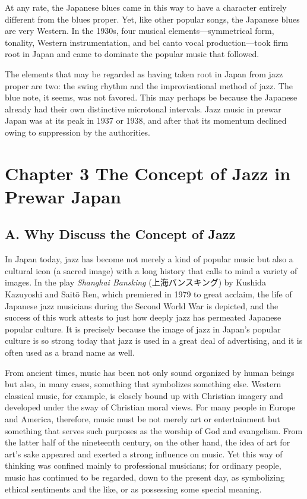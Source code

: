 At any rate, the Japanese blues came in this way to have a character entirely different from the blues proper. Yet, like other popular songs, the Japanese blues are very Western. In the 1930s, four musical elements—symmetrical form, tonality, Western instrumentation, and bel canto vocal production—took firm root in Japan and came to dominate the popular music that followed.

The elements that may be regarded as having taken root in Japan from jazz proper are two: the swing rhythm and the improvisational method of jazz. The blue note, it seems, was not favored. This may perhaps be because the Japanese already had their own distinctive microtonal intervals. Jazz music in prewar Japan was at its peak in 1937 or 1938, and after that its momentum declined owing to suppression by the authorities.

\section{Chapter 3  The Concept of Jazz in Prewar Japan}

\subsection{A. Why Discuss the Concept of Jazz}

In Japan today, jazz has become not merely a kind of popular music but also a cultural icon (a sacred image) with a long history that calls to mind a variety of images. In the play \textit{Shanghai Bansking} (上海バンスキング) by Kushida Kazuyoshi and Saitō Ren, which premiered in 1979 to great acclaim, the life of Japanese jazz musicians during the Second World War is depicted, and the success of this work attests to just how deeply jazz has permeated Japanese popular culture. It is precisely because the image of jazz in Japan's popular culture is so strong today that jazz is used in a great deal of advertising, and it is often used as a brand name as well.

From ancient times, music has been not only sound organized by human beings but also, in many cases, something that symbolizes something else. Western classical music, for example, is closely bound up with Christian imagery and developed under the sway of Christian moral views. For many people in Europe and America, therefore, music must be not merely art or entertainment but something that serves such purposes as the worship of God and evangelism. From the latter half of the nineteenth century, on the other hand, the idea of art for art's sake appeared and exerted a strong influence on music. Yet this way of thinking was confined mainly to professional musicians; for ordinary people, music has continued to be regarded, down to the present day, as symbolizing ethical sentiments and the like, or as possessing some special meaning.

